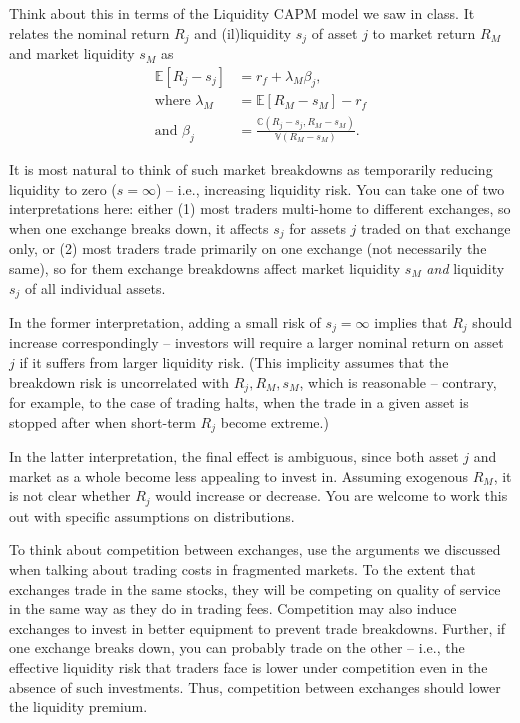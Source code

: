 \documentclass[11pt
, answers
]{exam}
\begin{document}
\begin{solution}
	Think about this in terms of the Liquidity CAPM model we saw in class. It relates the nominal return $R_j$ and (il)liquidity $s_j$ of asset $j$ to market return $R_M$ and market liquidity $s_M$ as
	\begin{align*}
		\mathbb{E} [R_j-s_j] &= r_f + \lambda_M \beta_j,
		\\
		\text{where } \lambda_M &= \mathbb{E} [R_M-s_M] - r_f
		\\
		\text{and } \beta_j &= \frac{\mathbb{C}(R_j-s_j, R_M-s_M)}{\mathbb{V}(R_M-s_M)}.
	\end{align*}
	
	It is most natural to think of such market breakdowns as temporarily reducing liquidity to zero ($s=\infty$) -- i.e., increasing liquidity risk. You can take one of two interpretations here: either (1) most traders multi-home to different exchanges, so when one exchange breaks down, it affects $s_j$ for assets $j$ traded on that exchange only, or (2) most traders trade primarily on one exchange (not necessarily the same), so for them exchange breakdowns affect market liquidity $s_M$ \emph{and} liquidity $s_j$ of all individual assets.
	
	In the former interpretation, adding a small risk of $s_j = \infty$ implies that $R_j$ should increase correspondingly -- investors will require a larger nominal return on asset $j$ if it suffers from larger liquidity risk. (This implicity assumes that the breakdown risk is uncorrelated with $R_j,R_M,s_M$, which is reasonable -- contrary, for example, to the case of trading halts, when the trade in a given asset is stopped after when short-term $R_j$ become extreme.)
	
	In the latter interpretation, the final effect is ambiguous, since both asset $j$ and market as a whole become less appealing to invest in. Assuming exogenous $R_M$, it is not clear whether $R_j$ would increase or decrease. You are welcome to work this out with specific assumptions on distributions.
	
	To think about competition between exchanges, use the arguments we discussed when talking about trading costs in fragmented markets. To the extent that exchanges trade in the same stocks, they will be competing on quality of service in the same way as they do in trading fees. Competition may also induce exchanges to invest in better equipment to prevent trade breakdowns. Further, if one exchange breaks down, you can probably trade on the other -- i.e., the effective liquidity risk that traders face is lower under competition even in the absence of such investments. Thus, competition between exchanges should lower the liquidity premium.
\end{solution}
\end{document}
